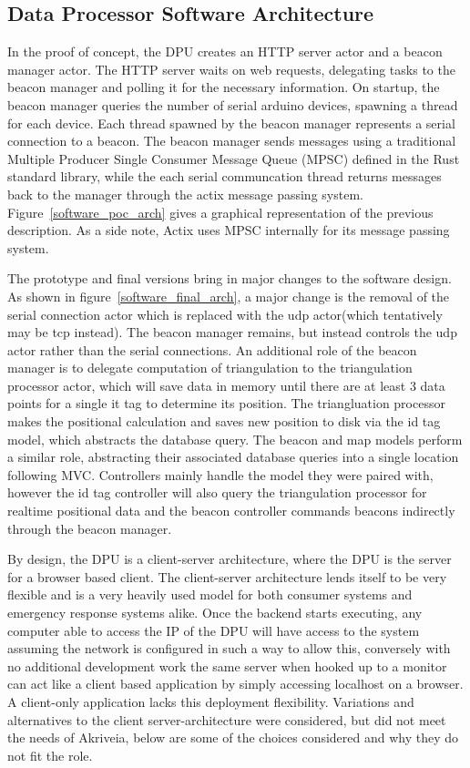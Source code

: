 \subsection{Data Processor Software Architecture}
In the proof of concept, the DPU creates an HTTP server actor and a beacon manager actor.
The HTTP server waits on web requests, delegating tasks to the beacon manager and polling it for the necessary information.
On startup, the beacon manager queries the number of serial arduino devices, spawning a thread for each device.
Each thread spawned by the beacon manager represents a serial connection to a beacon.
The beacon manager sends messages using a traditional Multiple Producer Single Consumer Message Queue (\Gls{MPSC}) defined in the Rust standard library, while the each serial communcation thread returns messages back to the manager through the actix message passing system.
Figure~\ref{software_poc_arch} gives a graphical representation of the previous description.
As a side note, Actix uses MPSC internally for its message passing system.

\bigskip
The prototype and final versions bring in major changes to the software design.
As shown in figure~\ref{software_final_arch}, a major change is the removal of the serial connection actor which is replaced with the udp actor(which tentatively may be tcp instead).
The beacon manager remains, but instead controls the udp actor rather than the serial connections.
An additional role of the beacon manager is to delegate computation of triangulation to the triangulation processor actor, which will save data in memory until there are at least 3 data points for a single it tag to determine its position.
The triangluation processor makes the positional calculation and saves new position to disk via the id tag model, which abstracts the database query.
The beacon and map models perform a similar role, abstracting their associated database queries into a single location following \Gls{MVC}.
Controllers mainly handle the model they were paired with, however the id tag controller will also query the triangulation processor for realtime positional data and the beacon controller commands beacons indirectly through the beacon manager.

\bigskip
By design, the DPU is a client-server architecture, where the DPU is the server for a browser based client.
The client-server architecture lends itself to be very flexible and is a very heavily used model for both consumer systems and emergency response systems alike.
Once the backend starts executing, any computer able to access the IP of the DPU will have access to the system assuming the network is configured in such a way to allow this, conversely with no additional development work the same server when hooked up to a monitor can act like a client based application by simply accessing localhost on a browser.
A client-only application lacks this deployment flexibility.
Variations and alternatives to the client server-architecture were considered, but did not meet the needs of Akriveia, below are some of the choices considered and why they do not fit the role.


